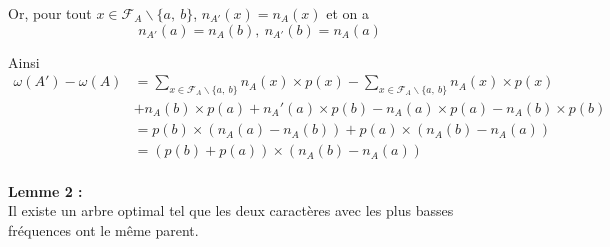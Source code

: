 \documentclass[a4paper, 12pt]{article}
\let\qed\square
\begin{document}
Or, pour tout $x \in \mathcal{F}_A\backslash\{a,\ b\}$, $n_{A'}(x) = n_A(x)$ et on a \\
$$
n_{A'}(a) = n_{A}(b),\ n_{A'}(b) = n_{A}(a)
$$

Ainsi
\begin{align*}
\omega(A')-\omega(A) &= \sum_{x\in \mathcal{F}_A\backslash\{a,\ b\}} n_A(x)\times p(x)‎‎-\sum_{x\in \mathcal{F}_A\backslash\{a,\ b\}} n_A(x)\times p(x)‎‎ \\
&+ n_A(b)\times p(a) + n_A'(a)\times p(b) - n_A(a)\times p(a) - n_A(b)\times p(b) \\
&= p(b)\times(n_A(a)-n_A(b)) + p(a)\times(n_A(b)-n_A(a)) \\
&= (p(b)+p(a))\times(n_A(b)-n_A(a))
\end{align*}
\qed \\

\textbf{Lemme 2 :} \\
Il existe un arbre optimal tel que les deux caractères avec les plus basses fréquences ont le même parent. \\
\end{document}

